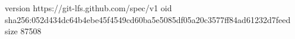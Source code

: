 version https://git-lfs.github.com/spec/v1
oid sha256:052d434dc64b4ebe45f4549cd60ba5e5085df05a20c3577ff84ad61232d7feed
size 87508
